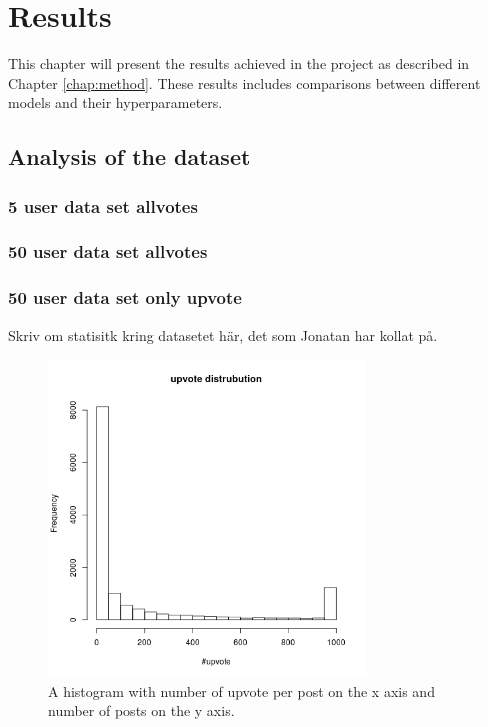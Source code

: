 \chapter{Results}\label{chap:results}
This chapter will present the results achieved in the project as described in Chapter \ref{chap:method}.  These results includes comparisons between different models and their hyperparameters.

\section{Analysis of the dataset}

\subsection{5 user data set allvotes}
\subsection{}

\subsection{50 user data set allvotes}
\subsection{50 user data set only upvote}


Skriv om statisitk kring datasetet här, det som Jonatan har kollat på.
\begin{figure}[h]
    \centering
    \includegraphics[width=0.75\textwidth]{figure/results/histupvote}
    \caption{A histogram with number of upvote per post on the x axis and number of posts on the y axis.}
    \label{fig:histvotes}
\end{figure}

